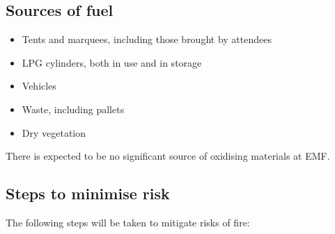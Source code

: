 \subsection{Sources of fuel}
\begin{itemize}
\tightlist
\item Tents and marquees, including those brought by attendees
\item LPG cylinders, both in use and in storage
\item Vehicles
\item Waste, including pallets
\item Dry vegetation
\end{itemize}

There is expected to be no significant source of oxidising materials at EMF.

\subsection{Steps to minimise risk}
The following steps will be taken to mitigate risks of fire:

